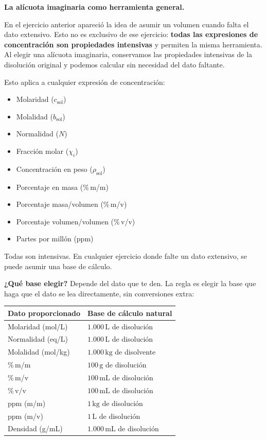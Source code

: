 \textbf{La alícuota imaginaria como herramienta general.}

En el ejercicio anterior apareció la idea de asumir un volumen cuando falta el 
dato extensivo. Esto no es exclusivo de ese ejercicio: \textbf{todas las 
expresiones de concentración son propiedades intensivas} y permiten la misma 
herramienta. Al elegir una alícuota imaginaria, conservamos las propiedades 
intensivas de la disolución original y podemos calcular sin necesidad del dato 
faltante.

Esto aplica a cualquier expresión de concentración:
\begin{itemize}
    \item Molaridad ($c_{\mathrm{sol}}$)
    \item Molalidad ($b_{\mathrm{sol}}$)
    \item Normalidad ($N$)
    \item Fracción molar ($\chi_i$)
    \item Concentración en peso ($\rho_{\mathrm{sol}}$)
    \item Porcentaje en masa (\%\,m/m)
    \item Porcentaje masa/volumen (\%\,m/v)
    \item Porcentaje volumen/volumen (\%\,v/v)
    \item Partes por millón (ppm)
\end{itemize}

Todas son intensivas. En cualquier ejercicio donde falte un dato extensivo, se 
puede asumir una base de cálculo.

\textbf{¿Qué base elegir?} Depende del dato que te den. La regla es elegir la 
base que haga que el dato se lea directamente, sin conversiones extra:

\begin{center}
\begin{tabular}{|l|l|}
\hline
\textbf{Dato proporcionado} & \textbf{Base de cálculo natural} \\
\hline
Molaridad (mol/L) & $1.000\,\mathrm{L}$ de disolución \\
Normalidad (eq/L) & $1.000\,\mathrm{L}$ de disolución \\
Molalidad (mol/kg) & $1.000\,\mathrm{kg}$ de disolvente \\
\%\,m/m & $100\,\mathrm{g}$ de disolución \\
\%\,m/v & $100\,\mathrm{mL}$ de disolución \\
\%\,v/v & $100\,\mathrm{mL}$ de disolución \\
ppm (m/m) & $1\,\mathrm{kg}$ de disolución \\
ppm (m/v) & $1\,\mathrm{L}$ de disolución \\
Densidad (g/mL) & $1.000\,\mathrm{mL}$ de disolución \\
\hline
\end{tabular}
\end{center}

